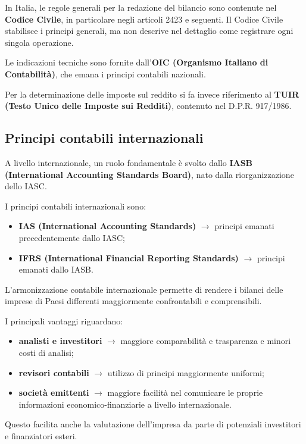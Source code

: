 \noindent In Italia, le regole generali per la redazione del bilancio sono contenute nel \textbf{Codice Civile}, in particolare negli articoli 2423 
e seguenti. Il Codice Civile stabilisce i principi generali, ma non descrive nel dettaglio come registrare ogni singola operazione.

\noindent Le indicazioni tecniche sono fornite dall'\textbf{OIC (Organismo Italiano di Contabilità)}, che emana i principi contabili nazionali.

\noindent Per la determinazione delle imposte sul reddito si fa invece riferimento al \textbf{TUIR (Testo Unico delle Imposte sui Redditi)}, contenuto nel D.P.R. 917/1986.

\subsection{Principi contabili internazionali}
A livello internazionale, un ruolo fondamentale è svolto dallo \textbf{IASB (International Accounting Standards Board)}, nato dalla riorganizzazione dello IASC.

\noindent I principi contabili internazionali sono:
\begin{itemize}
    \item \textbf{IAS (International Accounting Standards)} $\rightarrow$ principi emanati precedentemente dallo IASC;
    \item \textbf{IFRS (International Financial Reporting Standards)} $\rightarrow$ principi emanati dallo IASB.
\end{itemize}

\noindent L'armonizzazione contabile internazionale permette di rendere i bilanci delle imprese di Paesi differenti maggiormente confrontabili e comprensibili.

\noindent I principali vantaggi riguardano:
\begin{itemize}
    \item \textbf{analisti e investitori} $\rightarrow$ maggiore comparabilità e trasparenza e minori costi di analisi;
    \item \textbf{revisori contabili} $\rightarrow$ utilizzo di principi maggiormente uniformi;
    \item \textbf{società emittenti} $\rightarrow$ maggiore facilità nel comunicare le proprie informazioni economico-finanziarie a livello internazionale.
\end{itemize}

\noindent Questo facilita anche la valutazione dell'impresa da parte di potenziali investitori e finanziatori esteri.

